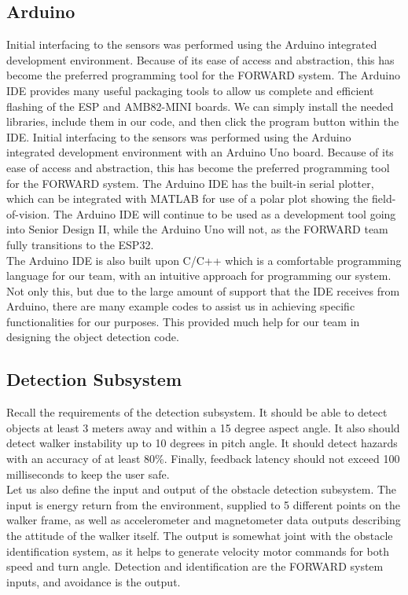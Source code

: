 \subsection{Arduino}
\noindent Initial interfacing to the sensors was performed using the Arduino integrated development environment. Because of its ease of access and abstraction, this has become the preferred programming tool for the FORWARD system. The Arduino IDE provides many useful packaging tools to allow us complete and efficient flashing of the ESP and AMB82-MINI boards. We can simply install the needed libraries, include them in our code, and then click the program button within the IDE. \noindent Initial interfacing to the sensors was performed using the Arduino integrated development environment with an Arduino Uno board. Because of its ease of access and abstraction, this has become the preferred programming tool for the FORWARD system. The Arduino IDE has the built-in serial plotter, which can be integrated with MATLAB for use of a polar plot showing the field-of-vision. The Arduino IDE will continue to be used as a development tool going into Senior Design II, while the Arduino Uno will not, as the FORWARD team fully transitions to the ESP32.\\

\noindent The Arduino IDE is also built upon C/C++ which is a comfortable programming language for our team, with an intuitive approach for programming our system. Not only this, but due to the large amount of support that the IDE receives from Arduino, there are many example codes to assist us in achieving specific functionalities for our purposes. This provided much help for our team in designing the object detection code. \\

\subsection{Detection Subsystem}
\noindent Recall the requirements of the detection subsystem. It should be able to detect objects at least 3 meters away and within a 15 degree aspect angle. It also should detect walker instability up to 10 degrees in pitch angle. It should detect hazards with an accuracy of at least 80\%. Finally, feedback latency should not exceed 100 milliseconds to keep the user safe.\\

\noindent Let us also define the input and output of the obstacle detection subsystem. The input is energy return from the environment, supplied to 5 different points on the walker frame, as well as accelerometer and magnetometer data outputs describing the attitude of the walker itself. The output is somewhat joint with the obstacle identification system, as it helps to generate velocity motor commands for both speed and turn angle. Detection and identification are the FORWARD system inputs, and avoidance is the output.

